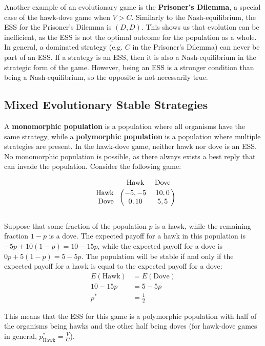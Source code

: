 \documentclass[12pt]{article}
\begin{document}
\newpage
\noindent
Another example of an evolutionary game is the \textbf{Prisoner's Dilemma}, a special case of the hawk-dove game when $V > C$.
Similarly to the Nash-equilibrium, the ESS for the Prisoner's Dilemma is $(D, D)$.
This shows us that evolution can be inefficient, as the ESS is not the optimal outcome for the population as a whole.
In general, a dominated strategy (e.g. $C$ in the Prisoner's Dilemma) can never be part of an ESS.
If a strategy is an ESS, then it is also a Nash-equilibrium in the strategic form of the game.
However, being an ESS is a stronger condition than being a Nash-equilibrium, so the opposite is not necessarily true.

\subsection{Mixed Evolutionary Stable Strategies}
A \textbf{monomorphic population} is a population where all organisms have the same strategy, while a \textbf{polymorphic population} is a population where multiple strategies are present.
In the hawk-dove game, neither hawk nor dove is an ESS.
No monomorphic population is possible, as there always exists a best reply that can invade the population.
Consider the following game:

\[ \begin{blockarray}{ccc}
    & \text{Hawk} & \text{Dove} \\[0.5ex]
    \begin{block}{r(cc)}
        \text{Hawk } & -5,-5 & 10,0 \\
        \text{Dove } & 0,10 & 5,5 \\
    \end{block}
\end{blockarray} \]

\noindent
Suppose that some fraction of the population $p$ is a hawk, while the remaining fraction $1 - p$ is a dove.
The expected payoff for a hawk in this population is $-5p + 10(1 - p) = 10 - 15p$, while the expected payoff for a dove is $0p + 5(1 - p) = 5 - 5p$.
The population will be stable if and only if the expected payoff for a hawk is equal to the expected payoff for a dove:
\begin{align*}
    E(\text{Hawk}) &= E(\text{Dove}) \\
    10 - 15p &= 5 - 5p \\
    p^* &= \frac{1}{2}
\end{align*}

\noindent
This means that the ESS for this game is a polymorphic population with half of the organisms being hawks and the other half being doves (for hawk-dove games in general, $p^*_{\text{Hawk}} = \frac{V}{C}$).
\end{document}

